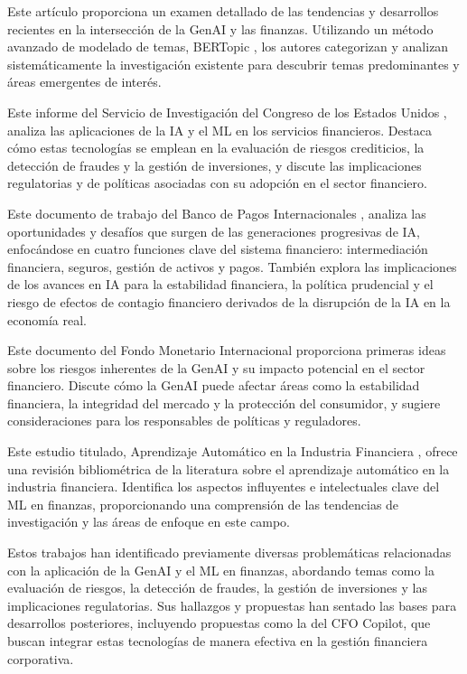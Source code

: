 \documentclass[12pt,letterpaper,oneside]{report}
\renewcommand{\_}{\UnderscoreOriginal\allowbreak}
\begin{document}
Este artículo \parencite{Lee2024} proporciona un examen detallado de las tendencias y desarrollos recientes en la intersección de la GenAI y las finanzas. Utilizando un método avanzado de modelado de temas, BERTopic \parencite{Grootendorst2022}, los autores categorizan y analizan sistemáticamente la investigación existente para descubrir temas predominantes y áreas emergentes de interés.

Este informe del Servicio de Investigación del Congreso de los Estados Unidos \parencite{Tierno2024}, analiza las aplicaciones de la IA y el ML en los servicios financieros. Destaca cómo estas tecnologías se emplean en la evaluación de riesgos crediticios, la detección de fraudes y la gestión de inversiones, y discute las implicaciones regulatorias y de políticas asociadas con su adopción en el sector financiero.

Este documento de trabajo del Banco de Pagos Internacionales \parencite{Aldasoro2024}, analiza las oportunidades y desafíos que surgen de las generaciones progresivas de IA, enfocándose en cuatro funciones clave del sistema financiero: intermediación financiera, seguros, gestión de activos y pagos. También explora las implicaciones de los avances en IA para la estabilidad financiera, la política prudencial y el riesgo de efectos de contagio financiero derivados de la disrupción de la IA en la economía real.

Este documento del Fondo Monetario Internacional \parencite{Shabsigh2023} proporciona primeras ideas sobre los riesgos inherentes de la GenAI y su impacto potencial en el sector financiero. Discute cómo la GenAI puede afectar áreas como la estabilidad financiera, la integridad del mercado y la protección del consumidor, y sugiere consideraciones para los responsables de políticas y reguladores.

Este estudio titulado, Aprendizaje Automático en la Industria Financiera \parencite{Zakaria2023}, ofrece una revisión bibliométrica de la literatura sobre el aprendizaje automático en la industria financiera. Identifica los aspectos influyentes e intelectuales clave del ML en finanzas, proporcionando una comprensión de las tendencias de investigación y las áreas de enfoque en este campo.

Estos trabajos han identificado previamente diversas problemáticas relacionadas con la aplicación de la GenAI y el ML en finanzas, abordando temas como la evaluación de riesgos, la detección de fraudes, la gestión de inversiones y las implicaciones regulatorias. Sus hallazgos y propuestas han sentado las bases para desarrollos posteriores, incluyendo propuestas como la del CFO Copilot, que buscan integrar estas tecnologías de manera efectiva en la gestión financiera corporativa.
\end{document}
